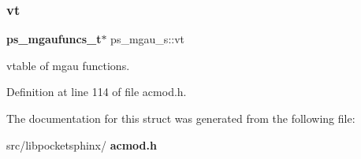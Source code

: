 \mbox{\label{structps__mgau__s_a931f7cbf334b8ed50b0e1c2803a10c67}} 
\subsubsection{vt}
{\footnotesize\ttfamily \textbf{ ps\+\_\+mgaufuncs\+\_\+t}$\ast$ ps\+\_\+mgau\+\_\+s\+::vt}



vtable of mgau functions. 



Definition at line 114 of file acmod.\+h.



The documentation for this struct was generated from the following file\+:\begin{DoxyCompactItemize}
\item 
src/libpocketsphinx/\textbf{ acmod.\+h}\end{DoxyCompactItemize}

